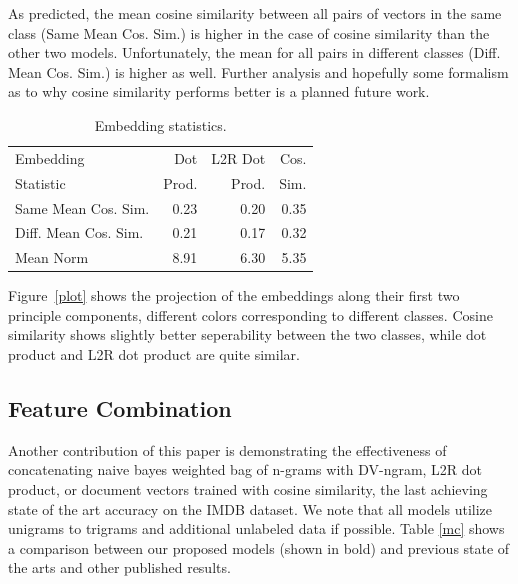 \documentclass[11pt,a4paper]{article}
\begin{document}
As predicted, the mean cosine similarity between all pairs of vectors in the same class (Same Mean Cos. Sim.) is higher in the case of cosine similarity than the other two models. Unfortunately, the mean for all pairs in different classes (Diff. Mean Cos. Sim.) is higher as well. Further analysis and hopefully some formalism as to why cosine similarity performs better is a planned future work.

\begin{table}[h]
	\centering
	\small
	\begin{tabular}{@{\hskip6pt}lrrr@{\hskip6pt}}
		\toprule
		Embedding & Dot  &  L2R Dot &  Cos. \\ 
		Statistic&Prod.  & Prod.  & Sim. \\
		\midrule
		Same Mean Cos. Sim. & 0.23 & 0.20 & 0.35\\
		Diff. Mean Cos. Sim. & 0.21 & 0.17 & 0.32\\ 
		Mean Norm & 8.91 & 6.30 & 5.35\\
		\bottomrule
	\end{tabular}
	\caption{Embedding statistics.}
	\label{es}
\end{table}

Figure~\ref{plot} shows the projection of the embeddings along their first two principle components, different colors corresponding to different classes. Cosine similarity shows slightly better seperability between the two classes, while dot product and L2R dot product are quite similar.

\subsection{Feature Combination}

Another contribution of this paper is demonstrating the effectiveness of concatenating naive bayes weighted bag of n-grams with DV-ngram, L2R dot product, or document vectors trained with cosine similarity, the last achieving state of the art accuracy on the IMDB dataset. We note that all models utilize unigrams to trigrams and additional unlabeled data if possible. 
Table \ref{mc} shows a comparison between our
proposed models (shown in bold) and previous
state of the arts and other published results. 
\end{document}
